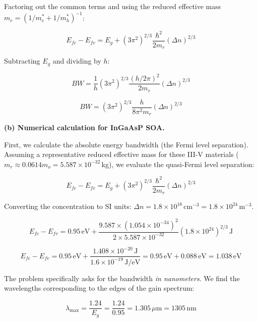Factoring out the common terms and using the reduced effective mass $m_r = (1/m_e^* + 1/m_h^*)^{-1}$:

\begin{equation*}
  E_{fc} - E_{fv} = E_g + (3\pi^2)^{2/3} \frac{\hbar^2}{2 m_r} (\Delta n)^{2/3}
\end{equation*}

Subtracting $E_g$ and dividing by $h$:

\begin{equation*}
  BW = \frac{1}{h} (3\pi^2)^{2/3} \frac{(h/2\pi)^2}{2 m_r} (\Delta n)^{2/3}
\end{equation*}

\begin{equation*}
  \boxed{BW = (3\pi^2)^{2/3} \frac{h}{8\pi^2 m_r} (\Delta n)^{2/3}}
\end{equation*}

\textbf{(b) Numerical calculation for InGaAsP SOA.}

First, we calculate the absolute energy bandwidth (the Fermi level separation). Assuming a representative reduced effective mass for these III-V materials ($m_r \approx 0.0614 m_o = 5.587 \times 10^{-32}$\,kg), we evaluate the quasi-Fermi level separation:

\begin{equation*}
  E_{fc} - E_{fv} = E_g + (3\pi^2)^{2/3} \frac{\hbar^2}{2 m_r} (\Delta n)^{2/3}
\end{equation*}

Converting the concentration to SI units: $\Delta n = 1.8 \times 10^{18}\,\text{cm}^{-3} = 1.8 \times 10^{24}\,\text{m}^{-3}$.

\begin{equation*}
  E_{fc} - E_{fv} = 0.95\,\text{eV} + \frac{9.587 \times (1.054 \times 10^{-34})^2}{2 \times 5.587 \times 10^{-32}} (1.8 \times 10^{24})^{2/3}\,\text{J}
\end{equation*}

\begin{equation*}
  E_{fc} - E_{fv} = 0.95\,\text{eV} + \frac{1.408 \times 10^{-20}\,\text{J}}{1.6 \times 10^{-19}\,\text{J/eV}} = 0.95\,\text{eV} + 0.088\,\text{eV} = 1.038\,\text{eV}
\end{equation*}

The problem specifically asks for the bandwidth \emph{in nanometers}. We find the wavelengths corresponding to the edges of the gain spectrum:

\begin{equation*}
  \lambda_{\text{max}} = \frac{1.24}{E_g} = \frac{1.24}{0.95} = 1.305\,\mu\text{m} = 1305\,\text{nm}
\end{equation*}

